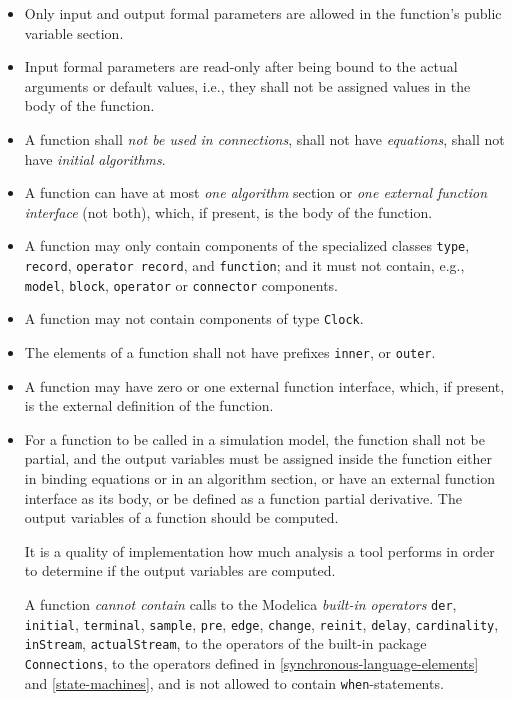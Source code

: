 \begin{itemize}
\item
  Only input and output formal parameters are allowed in the function's public variable section.
\item
  Input formal parameters are read-only after being bound to the actual
  arguments or default values, i.e., they shall not be assigned values in
  the body of the function.
\item
  A function shall \emph{not be used in connections}, shall not have
  \emph{equations}, shall not have \emph{initial algorithms}.
\item
  A function can have at most \emph{one algorithm} section or \emph{one
  external function interface} (not both), which, if present, is the
  body of the function.
\item
  A function may only contain components of the specialized classes \lstinline!type!, \lstinline!record!, \lstinline!operator record!, and \lstinline!function!; and it must not contain, e.g., \lstinline!model!, \lstinline!block!, \lstinline!operator! or \lstinline!connector! components.
\item
  A function may not contain components of type \lstinline!Clock!.
\item
  The elements of a function shall not have prefixes \lstinline!inner!, or \lstinline!outer!.
\item
  A function may have zero or one external function interface, which, if
  present, is the external definition of the function.
\item
  For a function to be called in a simulation model, the function shall
  not be partial, and the output variables must be assigned inside the
  function either in binding equations or in an algorithm section,
  or have an external function interface as its body, or be defined as a
  function partial derivative. The output variables of a function should
  be computed.
  \begin{nonnormative}
  It is a quality of implementation how much analysis a tool performs in order to determine if the output variables are computed.
  \end{nonnormative}
  A function \emph{cannot contain} calls to the Modelica \emph{built-in operators} \lstinline!der!, \lstinline!initial!, \lstinline!terminal!, \lstinline!sample!, \lstinline!pre!, \lstinline!edge!, \lstinline!change!, \lstinline!reinit!, \lstinline!delay!, \lstinline!cardinality!, \lstinline!inStream!, \lstinline!actualStream!, to the operators of the built-in package \lstinline!Connections!, to the operators defined in \cref{synchronous-language-elements} and \cref{state-machines}, and is not allowed to contain \lstinline!when!-statements.

\end{itemize}
